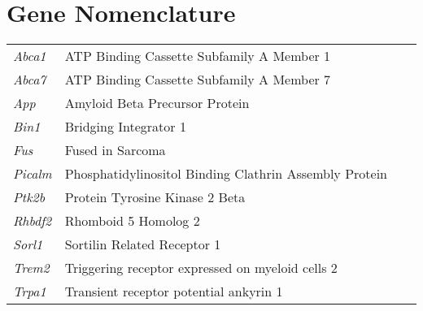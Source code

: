 \chapter*{Gene Nomenclature}

\setlength{\tabcolsep}{12pt}
\begin{tabular}{l p{1.5\linewidth}}
\textit{Abca1}& ATP Binding Cassette Subfamily A Member 1 \\
\textit{Abca7}&  ATP Binding Cassette Subfamily A Member 7 \\
\textit{App}& Amyloid Beta Precursor Protein \\
\textit{Bin1}&Bridging Integrator 1 \\
\textit{Fus}&Fused in Sarcoma \\
\textit{Picalm}&Phosphatidylinositol Binding Clathrin Assembly Protein \\
\textit{Ptk2b}&Protein Tyrosine Kinase 2 Beta \\
\textit{Rhbdf2}&Rhomboid 5 Homolog 2 \\
\textit{Sorl1}&Sortilin Related Receptor 1 \\
\textit{Trem2}&Triggering receptor expressed on myeloid cells 2 \\
\textit{Trpa1}&Transient receptor potential ankyrin 1 \\
\end{tabular}

